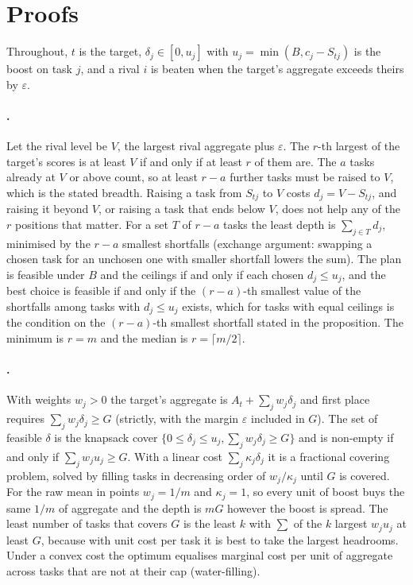 \appendix

\section{Proofs}
\label{app:proofs}

Throughout, $t$ is the target, $\delta_j\in[0,u_j]$ with $u_j=\min(B,c_j-S_{tj})$ is the boost on task $j$, and a rival $i$ is beaten when the target's aggregate exceeds theirs by $\varepsilon$.

\paragraph{.}
Let the rival level be $V$, the largest rival aggregate plus $\varepsilon$. The $r$-th largest of the target's scores is at least $V$ if and only if at least $r$ of them are. The $a$ tasks already at $V$ or above count, so at least $r-a$ further tasks must be raised to $V$, which is the stated breadth. Raising a task from $S_{tj}$ to $V$ costs $d_j=V-S_{tj}$, and raising it beyond $V$, or raising a task that ends below $V$, does not help any of the $r$ positions that matter. For a set $T$ of $r-a$ tasks the least depth is $\sum_{j\in T}d_j$, minimised by the $r-a$ smallest shortfalls (exchange argument: swapping a chosen task for an unchosen one with smaller shortfall lowers the sum). The plan is feasible under $B$ and the ceilings if and only if each chosen $d_j\le u_j$, and the best choice is feasible if and only if the $(r-a)$-th smallest value of the shortfalls among tasks with $d_j\le u_j$ exists, which for tasks with equal ceilings is the condition on the $(r-a)$-th smallest shortfall stated in the proposition. The minimum is $r=m$ and the median is $r=\lceil m/2\rceil$.

\paragraph{.}
With weights $w_j>0$ the target's aggregate is $A_t+\sum_jw_j\delta_j$ and first place requires $\sum_jw_j\delta_j\ge G$ (strictly, with the margin $\varepsilon$ included in $G$). The set of feasible $\delta$ is the knapsack cover $\{0\le\delta_j\le u_j,\sum_jw_j\delta_j\ge G\}$ and is non-empty if and only if $\sum_jw_ju_j\ge G$. With a linear cost $\sum_j\kappa_j\delta_j$ it is a fractional covering problem, solved by filling tasks in decreasing order of $w_j/\kappa_j$ until $G$ is covered. For the raw mean in points $w_j=1/m$ and $\kappa_j=1$, so every unit of boost buys the same $1/m$ of aggregate and the depth is $mG$ however the boost is spread. The least number of tasks that covers $G$ is the least $k$ with $\sum$ of the $k$ largest $w_ju_j$ at least $G$, because with unit cost per task it is best to take the largest headrooms. Under a convex cost the optimum equalises marginal cost per unit of aggregate across tasks that are not at their cap (water-filling).

